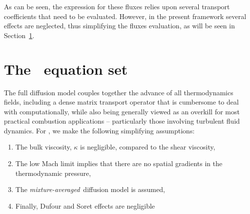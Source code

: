 As can be seen, the expression for these fluxes relies upon several transport coefficients that need to be evaluated. However, in the present framework several effects are neglected, thus simplifying the fluxes evaluation, as will be seen in Section~\ref{SumUpEq}.



\section{The \pelelm\ equation set}
\label{SumUpEq}
The full diffusion model couples together the advance of all thermodynamics fields, including a dense matrix transport operator that is cumbersome to deal with computationally, while also being generally viewed as an overkill for most practical combustion applications -- particularly those involving turbulent fluid dynamics.  For \pelelm, we make the following simplifying assumptions:
\begin{enumerate}
\item The bulk viscosity, $\kappa$ is negligible, compared to the shear viscosity,
\item The low Mach limit implies that there are no spatial gradients in the thermodynamic pressure,
\item The \textit{mixture-averaged}\ diffusion model is assumed,
\item Finally, Dufour and Soret effects are negligible
\end{enumerate}

